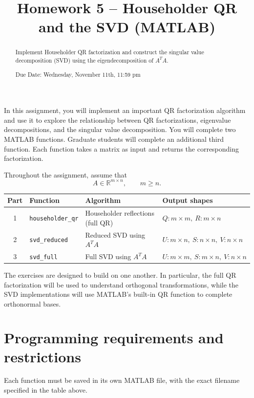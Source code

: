 \documentclass{ximera}
\begin{document}
\title{Homework 5 -- Householder QR and the SVD (MATLAB)}

\begin{abstract}
Implement Householder QR factorization and construct the singular
value decomposition (SVD) using the eigendecomposition of $A^TA$.

Due Date: Wednesday, November 11th, 11:59 pm
\end{abstract}

\maketitle

In this assignment, you will implement an important QR factorization
algorithm and use it to explore the relationship between QR
factorizations, eigenvalue decompositions, and the singular value
decomposition. You will complete two MATLAB functions. Graduate
students will complete an additional third function. Each function
takes a matrix as input and returns the corresponding factorization.

Throughout the assignment, assume that
\[
A\in\mathbb{R}^{m\times n}, \qquad m\geq n.
\]

\begin{center}
\begin{tabular}{|c|l|l|l|}
\hline
Part & Function & Algorithm & Output shapes\\
\hline
1 & \texttt{householder\_qr} &
Householder reflections (full QR) &
$Q:m\times m,\ R:m\times n$\\
\hline
2 & \texttt{svd\_reduced} &
Reduced SVD using $A^TA$ &
$U:m\times n,\ S:n\times n,\ V:n\times n$\\
\hline
3 & \texttt{svd\_full} &
Full SVD using $A^TA$ &
$U:m\times m,\ S:m\times n,\ V:n\times n$\\
\hline
\end{tabular}
\end{center}

The exercises are designed to build on one another. In particular,
the full QR factorization will be used to understand orthogonal
transformations, while the SVD implementations will use MATLAB's
built-in QR function to complete orthonormal bases.

\section*{Programming requirements and restrictions}

Each function must be saved in its own MATLAB file, with the exact
filename specified in the table above.
\end{document}
